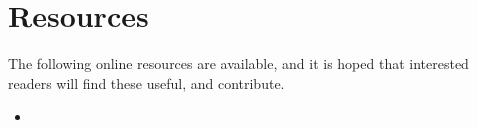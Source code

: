 \section{Resources}

The following online resources are available, and it is hoped that interested readers will find these useful, and contribute.

\begin{itemize}
\item 
\end{itemize}